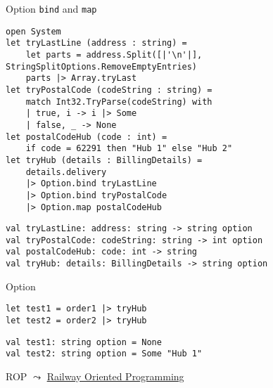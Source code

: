 \documentclass[t]{beamer}
\begin{document}
\begin{frame}[label={sec:org2d23f8e},fragile]{Option \texttt{bind} and \texttt{map}}
 \begin{verbatim}
open System
let tryLastLine (address : string) = 
    let parts = address.Split([|'\n'|], StringSplitOptions.RemoveEmptyEntries)
    parts |> Array.tryLast
let tryPostalCode (codeString : string) = 
    match Int32.TryParse(codeString) with 
    | true, i -> i |> Some
    | false, _ -> None
let postalCodeHub (code : int) = 
    if code = 62291 then "Hub 1" else "Hub 2"
let tryHub (details : BillingDetails) = 
    details.delivery
    |> Option.bind tryLastLine 
    |> Option.bind tryPostalCode 
    |> Option.map postalCodeHub
\end{verbatim}

\begin{verbatim}
val tryLastLine: address: string -> string option
val tryPostalCode: codeString: string -> int option
val postalCodeHub: code: int -> string
val tryHub: details: BillingDetails -> string option
\end{verbatim}
\end{frame}

\begin{frame}[label={sec:org40c23ad},fragile]{Option}
 \begin{verbatim}
let test1 = order1 |> tryHub
let test2 = order2 |> tryHub
\end{verbatim}

\begin{verbatim}
val test1: string option = None
val test2: string option = Some "Hub 1"
\end{verbatim}
\end{frame}

\begin{frame}[label={sec:org03b58c1}]{ROP}
\(\leadsto\) \href{./2 Railway Oriented Programming.pdf}{Railway Oriented Programming}
\end{frame}
\end{document}

